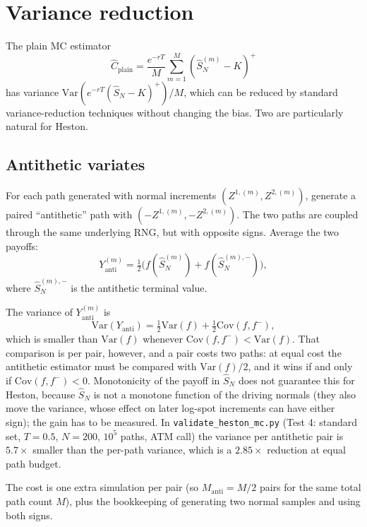 \documentclass[11pt]{article}
\theoremstyle{plain}
\theoremstyle{definition}
\theoremstyle{remark}
\begin{document}
\section{Variance reduction}

The plain MC estimator
\[
    \widehat C_{\mathrm{plain}} = \frac{e^{-rT}}{M} \sum_{m=1}^M (\hat S^{(m)}_N - K)^+
\]
has variance $\mathrm{Var}(e^{-rT}(\hat S_N - K)^+)/M$, which can be reduced by standard variance-reduction techniques without changing the bias. Two are particularly natural for Heston.

\subsection{Antithetic variates}

For each path generated with normal increments $(Z^{1,(m)}, Z^{2,(m)})$, generate a paired ``antithetic'' path with $(-Z^{1,(m)}, -Z^{2,(m)})$. The two paths are coupled through the same underlying RNG, but with opposite signs. Average the two payoffs:
\[
    Y^{(m)}_{\mathrm{anti}} = \tfrac12 \bigl(f(\hat S^{(m)}_N) + f(\hat S^{(m), -}_N)\bigr),
\]
where $\hat S^{(m), -}_N$ is the antithetic terminal value.

The variance of $Y^{(m)}_{\mathrm{anti}}$ is
\[
    \mathrm{Var}(Y_{\mathrm{anti}}) = \tfrac12 \mathrm{Var}(f) + \tfrac12 \mathrm{Cov}(f, f^-),
\]
which is smaller than $\mathrm{Var}(f)$ whenever $\mathrm{Cov}(f, f^-) < \mathrm{Var}(f)$. That comparison is per pair, however, and a pair costs two paths: at equal cost the antithetic estimator must be compared with $\mathrm{Var}(f)/2$, and it wins if and only if $\mathrm{Cov}(f, f^-) < 0$. Monotonicity of the payoff in $\hat S_N$ does not guarantee this for Heston, because $\hat S_N$ is not a monotone function of the driving normals (they also move the variance, whose effect on later log-spot increments can have either sign); the gain has to be measured. In \texttt{validate\_heston\_mc.py} (Test 4: standard set, $T = 0.5$, $N = 200$, $10^5$ paths, ATM call) the variance per antithetic pair is $5.7\times$ smaller than the per-path variance, which is a $2.85\times$ reduction at equal path budget.

The cost is one extra simulation per pair (so $M_{\mathrm{anti}} = M/2$ pairs for the same total path count $M$), plus the bookkeeping of generating two normal samples and using both signs.
\end{document}
